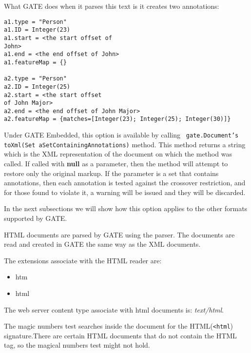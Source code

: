 What GATE does when it parses this text is it creates two
annotations:

\small
\begin{small}
\begin{verbatim}
a1.type = "Person"
a1.ID = Integer(23)
a1.start = <the start offset of
John>
a1.end = <the end offset of John>
a1.featureMap = {}

a2.type = "Person"
a2.ID = Integer(25)
a2.start = <the start offset
of John Major>
a2.end = <the end offset of John Major>
a2.featureMap = {matches=[Integer(23); Integer(25); Integer(30)]}

\end{verbatim}
\end{small}
\nnormalsize

Under GATE Embedded, this option is available by calling {\tt
gate.Document's toXml(Set aSetContainingAnnotations)} method. This
method returns a string which is the XML representation of the
document on which the method was called. If called with {\bf null}
as a parameter, then the method will attempt to restore only the
original markup. If the parameter is a set that contains
annotations, then each annotation is tested against the crossover
restriction, and for those found to violate it, a warning will be
issued and they will be discarded.

In the next subsections we will show how this option applies to
the other formats supported by GATE.



HTML documents are parsed by GATE using the
 parser.
The documents are read and created in GATE the same way as
the XML documents.

The extensions associate with the HTML reader are:
\begin{itemize}
\item
htm
\item
html
\end{itemize}

The web server content type associate with html documents is: {\em
text/html}.

The magic numbers test searches inside the document for the
HTML({\tt <html}) signature.There are certain HTML documents that
do not contain the HTML tag, so the magical numbers test might not
hold.

